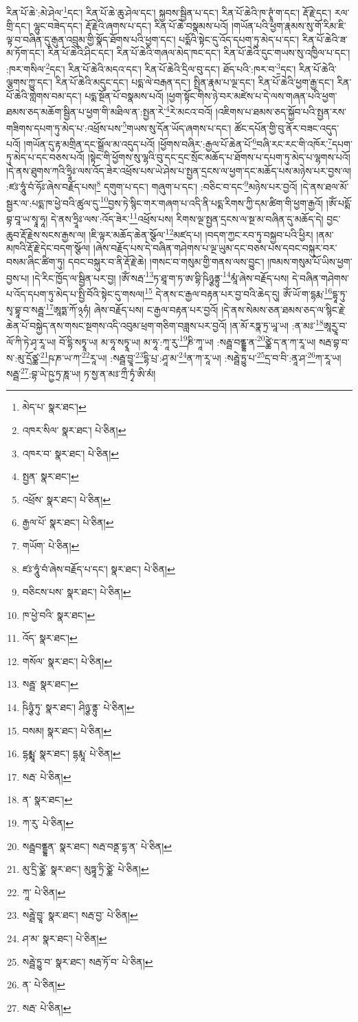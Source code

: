 རིན་པོ་ཆེ་:མེ་ཤེལ་\footnote{མེད་པ་  སྣར་ཐང་། }དང་། རིན་པོ་ཆེ་ཆུ་ཤེལ་དང་། སྐྱབས་སྦྱིན་པ་དང་། རིན་པོ་ཆེའི་ཁ་ཊྭཱཾ་ག་དང་། རྡོ་རྗེ་དང་། རལ་གྲི་དང་། ལྷུང་བཟེད་དང་། རྡོ་རྗེའི་ཞགས་པ་དང་། རིན་པོ་ཆེ་བསྣམས་པའོ། །གཡོན་པའི་ཕྱག་རྣམས་སུ་གོ་རིམ་ཇི་ལྟ་བ་བཞིན་དུ་རྒུན་འབྲུམ་གྱི་སྣོད་ཐོགས་པའི་ཕྱག་དང་། པདྨོའི་སྟེང་དུ་འོད་དཔག་ཏུ་མེད་པ་དང་། རིན་པོ་ཆེའི་ཟ་མ་ཏོག་དང་། རིན་པོ་ཆེའི་ཤིང་དང་། རིན་པོ་ཆེའི་གཞལ་མེད་ཁང་དང་། རིན་པོ་ཆེའི་དུང་གཡས་སུ་འཁྱིལ་པ་དང་། :ཁར་གསིལ་\footnote{འཁར་སིལ་  སྣར་ཐང་།  པེ་ཅིན། }དང་། རིན་པོ་ཆེའི་མདའ་དང་། རིན་པོ་ཆེའི་དྲིལ་བུ་དང་། ཐོད་པའི་:ཁར་བ་\footnote{འཁར་བ་  སྣར་ཐང་།  པེ་ཅིན། }དང་། རིན་པོ་ཆེའི་ལྕགས་ཀྱུ་དང་། རིན་པོ་ཆེའི་མདུང་དང་། པདྨ་ལེ་བརྒན་དང་། སྤྲིན་རྣམ་པ་ལྔ་དང་། རིན་པོ་ཆེའི་ཕྱག་རྒྱ་དང་། རིན་པོ་ཆེའི་གླེགས་བམ་དང་། པདྨ་སྔོན་པོ་བསྣམས་པའོ། །ཕྱག་སྟོང་གིས་ཉེ་བར་མཛེས་པ་དེ་ལས་གཞན་པའི་ཕྱག་ཐམས་ཅད་མཆོག་སྦྱིན་པ་ཕྱག་གི་མཐིལ་ན་:སྤྱན་རེ་\footnote{སྤྱན་  སྣར་ཐང་། }རེ་མངའ་བའོ། །འཇིགས་པ་ཐམས་ཅད་སྐྱོབ་པའི་སྤྱན་རས་གཟིགས་དཔག་ཏུ་མེད་པ་:འཕྲོས་པས་\footnote{འཕྲོས་  སྣར་ཐང་།  པེ་ཅིན། }གཡས་སུ་དོན་ཡོད་ཞགས་པ་དང་། ཚོང་དཔོན་གྱི་བུ་ནོར་བཟང་འདུད་པའོ། །གཡོན་དུ་རྟ་མགྲིན་དང་སྒྲོལ་མ་འདུད་པའོ། །ཕྱོགས་བཞིར་:རྒྱལ་པོ་ཆེན་པོ་\footnote{རྒྱལ་པོ་  སྣར་ཐང་།  པེ་ཅིན། }བཞི་རང་རང་གི་འཁོར་\footnote{གཡོག་  པེ་ཅིན། }དཔག་ཏུ་མེད་པ་དང་བཅས་པའོ། །སྟེང་གི་ཕྱོགས་སུ་ལྷའི་བུ་དང་དྲང་སྲོང་མཆོད་པ་ཐོགས་པ་དཔག་ཏུ་མེད་པ་ལྷགས་པའོ། །དེ་ནས་ཐུགས་ཀའི་ཧྲཱིཿ་ལས་འོད་ཟེར་འཕྲོས་པས་ཡེ་ཤེས་པ་སྤྱན་དྲངས་ལ་ཕྱག་དང་མཆོད་པས་མཉེས་པར་བྱས་ལ། :ཛཿ་ཧཱུཾ་བཾ་ཧོཿ་ཞེས་བརྗོད་པས།\footnote{ཛཿ་ཧཱུཾ་བཾ་ཞེས་བརྗོད་པ་དང་།  སྣར་ཐང་།  པེ་ཅིན། } དགུག་པ་དང་། གཞུག་པ་དང་། :བཅིང་བ་དང་\footnote{བཅིངས་པས་  སྣར་ཐང་།  པེ་ཅིན། }མཉེས་པར་བྱའོ། །དེ་ནས་ཐལ་མོ་སྦྱར་ལ་:པདྨ་ཁ་ཕྱེ་བའི་ཚུལ་དུ་\footnote{ཁ་ཕྱེ་བའི་  སྣར་ཐང་། }བྱས་ཏེ་སྙིང་གར་གཞག་པ་འདི་ནི་པདྨ་རིགས་ཀྱི་དམ་ཚིག་གི་ཕྱག་རྒྱའོ། །ཨོཾ་པདྨོ་བྷ་བཱ་ཡ་སྭཱ་ཧཱ། དེ་ནས་ཧྲཱིཿ་ལས་:འོད་ཟེར་\footnote{འོད་  སྣར་ཐང་། }འཕྲོས་པས། རིགས་ལྔ་སྤྱན་དྲངས་ལ་སྔ་མ་བཞིན་དུ་མཆོད་དེ། བྱང་ཆུབ་རྡོ་རྗེས་སངས་རྒྱས་ལ། །ཇི་ལྟར་མཆོད་ཆེན་སྩོལ་\footnote{གསོལ་  སྣར་ཐང་།  པེ་ཅིན། }མཛད་པ། །བདག་ཀྱང་རབ་ཏུ་བསྐྱབ་པའི་ཕྱིར། །ནམ་མཁའི་རྡོ་རྗེ་དེང་བདག་སྩོལ། །ཞེས་བརྗོད་པས་དེ་བཞིན་གཤེགས་པ་ལྔ་ཡུམ་དང་བཅས་པས་དབང་བསྐུར་བར་བསམ་ཞིང་ཚིག་ཏུ། དབང་བསྐུར་བ་ནི་རྡོ་རྗེ་ཆེ། །གསང་བ་གསུམ་གྱི་གནས་ལས་བྱུང་། །ཁམས་གསུམ་པོ་ཡིས་ཕྱག་བྱས་པ། །དེ་རིང་ཁྱོད་ལ་སྦྱིན་པར་བྱ། །ཨོཾ་སརྦ་\footnote{སརྦྦ་  སྣར་ཐང་། }ཏ་ཐཱ་ག་ཏ་ཨ་བྷི་ཥིཉྩནྟུ་\footnote{ཥིཉྩཾ་ཏུ་  སྣར་ཐང་། ཤིཉྩ་ནྟུ་  པེ་ཅིན། }མཱཾ་ཞེས་བརྗོད་པས། དེ་བཞིན་གཤེགས་པ་འོད་དཔག་ཏུ་མེད་པ་སྤྱི་བོའི་སྟེང་དུ་གསལ།\footnote{བསམ།  སྣར་ཐང་།  པེ་ཅིན། } དེ་ནས་ང་རྒྱལ་བརྟན་པར་བྱ་བའི་ཆེད་དུ། ཨོཾ་ཡོ་ག་དྷརྨ་\footnote{དྷརྨྨཱ་  སྣར་ཐང་། དྷརྨཱ་  པེ་ཅིན། }དྷཱ་ཏུ་སྭ་བྷཱ་བ་སརྦྦ་\footnote{སརྦ་  པེ་ཅིན། }ཨཱཏྨ་ཀོ་྅ཧཾ། ཞེས་བརྗོད་པས། ང་རྒྱལ་བརྟན་པར་བྱའོ། །དེ་ནས་སེམས་ཅན་ཐམས་ཅད་ལ་སྙིང་རྗེ་ཆེན་པོ་བསྐྱེད་ནས་གསང་སྔགས་འདི་འབུམ་ཕྲག་གཅིག་བཟླས་པར་བྱའོ། །ན་མོ་རཏྣ་ཏྲ་ཡཱ་ཡ། :ན་མཿ་\footnote{ན་  སྣར་ཐང་། }ཨཱརྱཱ་བ་ལོ་ཀི་ཏེ་ཤྭ་རཱ་ཡ། བོ་དྷི་སཏྭཱ་ཡ། མ་ཧཱ་སཏྭཱ་ཡ། མ་ཧཱ་:ཀཱ་རུ་\footnote{ཀ་རུ་  པེ་ཅིན། }ཎི་ཀཱ་ཡ། :སརྦྦ་བནྡྷ་ན་\footnote{སརྦྦབནྡྷན་  སྣར་ཐང་། སརྦ་བནྡ་དྷ་ན་  པེ་ཅིན། }ཙྪེ་ད་ན་ཀ་རཱ་ཡ། སརྦ་བྷ་བ་ས་:མུ་དྲོཙྪ་\footnote{མུ་དྲི་ཙྪེ་  སྣར་ཐང་། མུཏྟཱ་ཏྲི་ཙྪེ་  པེ་ཅིན། }ཥ་ཎ་ཡ་ཀ་\footnote{ཀཱ་  པེ་ཅིན། }རཱ་ཡ། :སརྦྦ་བྱཱ་\footnote{སརྦྦེ་བྱཱ་  སྣར་ཐང་། སརྦ་བྱ་  པེ་ཅིན། }དྷི་པྲ་:ཤཱ་མ་\footnote{ཤ་མ་  སྣར་ཐང་།  པེ་ཅིན། }ན་ཀ་རཱ་ཡ། :སརྦྦེ་ཏྱུ་པ་\footnote{སརྦྦེ་ཏྱུ་བ་  སྣར་ཐང་། སརྦ་ཏོ་བ་  པེ་ཅིན། }དྲ་བ་བི་:ནཱ་ཤ་\footnote{ན་  པེ་ཅིན། }ཀ་རཱ་ཡ། སརྦྦ་\footnote{སརྦ་  པེ་ཅིན། }:བྷ་ཡེ་ཥྱ་ཏྲ་ཎཱ་ཡ། ཏ་སྱ་ན་མཿ་ཀྲྀ་ཏྭཾ་ཨི་མཾ། 